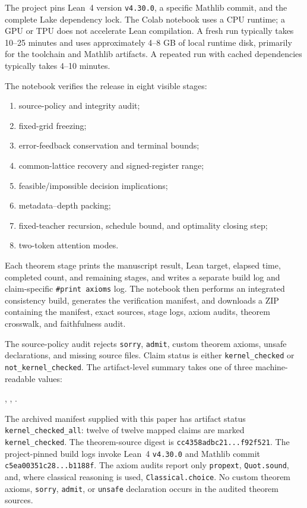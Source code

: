 \documentclass[twoside,11pt]{article}
\begin{document}
The project pins Lean~4 version \texttt{v4.30.0}, a specific Mathlib commit,
and the complete Lake dependency lock.  The Colab notebook uses a CPU runtime;
a GPU or TPU does not accelerate Lean compilation.  A fresh run typically
takes 10--25 minutes and uses approximately 4--8 GB of local runtime disk,
primarily for the toolchain and Mathlib artifacts.  A repeated run with cached
dependencies typically takes 4--10 minutes.

The notebook verifies the release in eight visible stages:
\begin{enumerate}[leftmargin=1.75em,itemsep=.2em]
\item source-policy and integrity audit;
\item fixed-grid freezing;
\item error-feedback conservation and terminal bounds;
\item common-lattice recovery and signed-register range;
\item feasible/impossible decision implications;
\item metadata--depth packing;
\item fixed-teacher recursion, schedule bound, and optimality closing step;
\item two-token attention modes.
\end{enumerate}
Each theorem stage prints the manuscript result, Lean target, elapsed time,
completed count, and remaining stages, and writes a separate build log and
claim-specific \texttt{\#print axioms} log.  The notebook then performs an
integrated consistency build, generates the verification manifest, and
downloads a ZIP containing the manifest, exact sources, stage logs, axiom
audits, theorem crosswalk, and faithfulness audit.

The source-policy audit rejects \texttt{sorry}, \texttt{admit}, custom theorem
axioms, unsafe declarations, and missing source files.  Claim status is either \texttt{kernel\_checked} or
\texttt{not\_kernel\_checked}.  The artifact-level summary takes one of three
machine-readable values:
\begin{center}
,\quad
{},\quad
{}.
\end{center}
The archived manifest supplied with this paper has artifact status
\texttt{kernel\_checked\_all}: twelve of twelve mapped claims are marked
\texttt{kernel\_checked}.  The theorem-source digest is
\texttt{cc4358adbc21...f92f521}.
The project-pinned build logs invoke Lean~4 \texttt{v4.30.0} and Mathlib commit
\texttt{c5ea00351c28...b1188f}.  The axiom audits report only
\texttt{propext}, \texttt{Quot.sound}, and, where classical reasoning is used,
\texttt{Classical.choice}.  No custom theorem axioms, \texttt{sorry},
\texttt{admit}, or \texttt{unsafe} declaration occurs in the audited theorem
sources.
\end{document}
